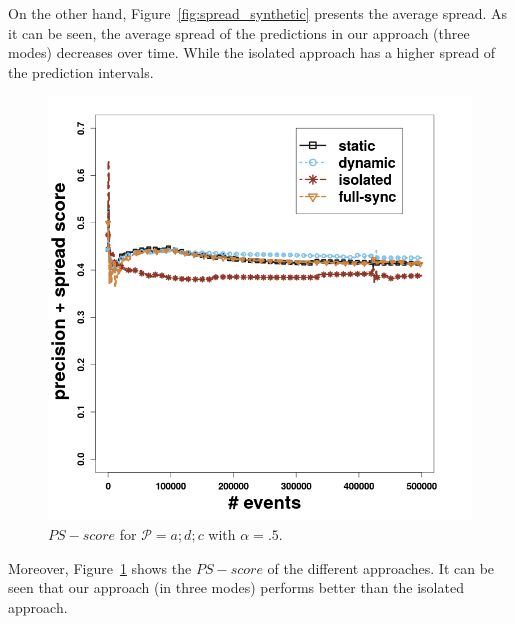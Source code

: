 \par On the other hand, Figure~\ref{fig:spread_synthetic} presents the average spread. As it can be seen, the average spread of the predictions in our approach (three modes) decreases over time. While the isolated approach has a higher spread of the prediction intervals. 
\begin{figure}[H]
	\centering
	\includegraphics[width=\textwidth]{chapters/figures/synthetic/newscore_synthetic_15_0001.png}
	
	\caption{$\mathit{PS-score}$ for $\mathcal{P}=a;d;c$ with $\alpha = .5$.}
	\label{fig:ps_score}
\end{figure}

\par Moreover, Figure~\ref{fig:ps_score} shows the $\mathit{PS-score}$ of the different approaches. It can be seen that our approach (in three modes) performs better than the isolated approach. %



